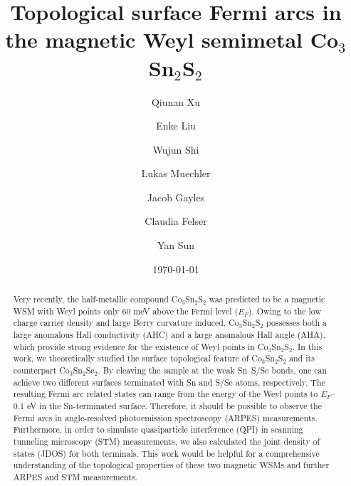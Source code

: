 \documentclass[aps,prb,reprint,superscriptaddress,amssymb,amsmath]{revtex4-1}
\begin{document}
\title{Topological surface Fermi arcs in the magnetic Weyl semimetal Co$_3$Sn$_2$S$_2$}

\author{Qiunan Xu}
\author{Enke Liu}
\author{Wujun Shi}
\author{Lukas Muechler}
\author{Jacob Gayles}
\author{Claudia Felser}
\author{Yan Sun}

\date{\today}

\begin{abstract}
Very recently, the half-metallic compound Co$_3$Sn$_2$S$_2$ was predicted to be a magnetic WSM with Weyl points only 60 meV above the Fermi level ($E_F$). 
Owing to the low charge carrier density and large Berry curvature induced, 
Co$_3$Sn$_2$S$_2$ possesses both a large anomalous Hall conductivity (AHC) and a large anomalous Hall angle (AHA), 
which provide strong evidence for the existence of Weyl points in Co$_3$Sn$_2$S$_2$. 
In this work, we theoretically studied the surface topological feature of Co$_3$Sn$_2$S$_2$ and its counterpart
Co$_3$Sn$_2$Se$_2$. By cleaving the sample at the weak Sn--S/Se bonds, one can achieve two different surfaces terminated with Sn and S/Se atoms, respectively. 
The resulting Fermi arc related states can range from the energy of the Weyl points to $E_F$--0.1 eV in the Sn-terminated surface.
Therefore, it should be possible to observe the Fermi arcs in angle-resolved photoemission spectroscopy (ARPES) measurements. 
Furthermore, in order to simulate quasiparticle interference (QPI) in scanning tunneling microscopy (STM) measurements, 
we also calculated the joint density of states (JDOS) for both terminals. 
This work would be helpful for a comprehensive understanding of the topological properties of these two magnetic WSMs 
and further ARPES and STM measurements.
\end{abstract}
\end{document}
